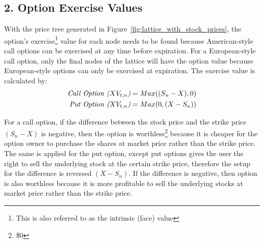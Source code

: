 \documentclass[12pt, letterpaper]{article}\usepackage{float}
\begin{document}
\pagebreak
\subsection*{2. Option Exercise Values}
With the price tree generated in Figure~\ref{fig:lattice_with_stock_prices}, the option's exercise\footnote{This is also referred to as the intrinsic (face) value} value for each node needs to be found because American-style call options can be exercised at any time before expiration.
For a European-style call option, only the final nodes of the lattice will have the option value because European-style options can only be exercised at expiration. 
The exercise value is calculated \cite{bopmwikipedia} by:
\begin{align*}
  \text{\textit{Call Option (${XV_{t,n}}$)}} &= Max({(S_n - X)}, 0) \\
  \text{\textit{Put Option (${XV_{t,n}}$)}} &= Max(0, {(X - S_n)}) 
\end{align*}

\bigskip

For a call option, if the difference between the stock price and the strike price ${(S_n - X)}$ is negative, then the option is worthless\footnote{\$0} because it is cheaper for the option owner to purchase the shares at market price rather than the strike price.
The same is applied for the put option, except put options gives the user the right to sell the underlying stock at the certain strike price, therefore the setup for the difference is reversed ${(X - S_n)}$.
If the difference is negative, then option is also worthless because it is more profitable to sell the underlying stocks at market price rather than the strike price.
\end{document}
